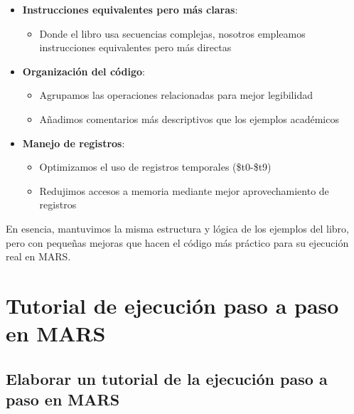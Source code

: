 \documentclass{article}
\begin{document}
\begin{itemize}[leftmargin=*]
    \item \textbf{Instrucciones equivalentes pero más claras}:
    \begin{itemize}
        \item Donde el libro usa secuencias complejas, nosotros empleamos instrucciones equivalentes pero más directas
        
    \end{itemize}
    
    \item \textbf{Organización del código}:
    \begin{itemize}
        \item Agrupamos las operaciones relacionadas para mejor legibilidad
        \item Añadimos comentarios más descriptivos que los ejemplos académicos
    \end{itemize}
    
    \item \textbf{Manejo de registros}:
    \begin{itemize}
        \item Optimizamos el uso de registros temporales (\$t0-\$t9)
        \item Redujimos accesos a memoria mediante mejor aprovechamiento de registros
    \end{itemize}
\end{itemize}

En esencia, mantuvimos la misma estructura y lógica de los ejemplos del libro, pero con pequeñas mejoras que hacen el código más práctico para su ejecución real en MARS.

\section{Tutorial de ejecución paso a paso en MARS}

\subsection{Elaborar un tutorial de la ejecución paso a paso en MARS}
\end{document}

